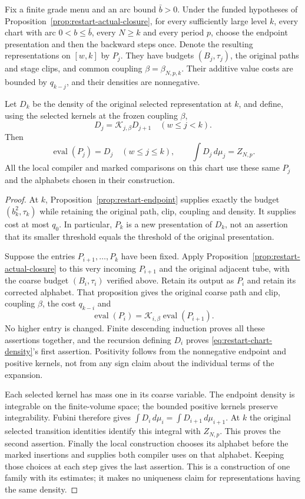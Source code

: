 \begin{proposition}
\label{prop:restart-chart-family}
Fix a finite grade menu and an arc bound $\bar b>0$. Under the funded
hypotheses of Proposition~\ref{prop:restart-actual-closure}, for every
sufficiently large level $k$, every chart with arc $0<b\le\bar b$,
every $N\ge k$ and every
period $p$, choose the endpoint presentation and then the backward
steps once. Denote the resulting representations on $[w,k]$ by $P_j$.
They have budgets $(B_j,\tau_j)$, the original paths and stage clips,
and common coupling $\beta=\beta_{N,p,k}$. Their additive value costs
are bounded by $q_{k-j}$, and their densities are nonnegative.

Let $D_k$ be the density of the original selected representation at $k$,
and define, using the selected kernels at the frozen coupling $\beta$,
\[
 D_j=\mathcal K_{j,\beta}D_{j+1}\quad(w\le j<k).
\]
Then
\begin{equation}\label{eq:restart-chart-density}
 \operatorname{eval}(P_j)=D_j\quad(w\le j\le k),\qquad
 \int D_j\,d\mu_j=Z_{N,p}.
\end{equation}
All the local compiler and marked comparisons on this chart use these
same $P_j$ and the alphabets chosen in their construction.
\end{proposition}
\begin{proof}
At $k$, Proposition~\ref{prop:restart-endpoint} supplies exactly the
budget $(b_k^2,\tau_k)$ while retaining the original path, clip,
coupling and density. It supplies cost at most $q_0$. In particular,
$P_k$ is a new presentation of $D_k$, not an assertion that its smaller
threshold equals the threshold of the original presentation.

Suppose the entries $P_{i+1},\ldots,P_k$ have been fixed. Apply
Proposition~\ref{prop:restart-actual-closure} to this very incoming
$P_{i+1}$ and the original adjacent tube, with the coarse budget
$(B_i,\tau_i)$ verified above. Retain its output as $P_i$ and retain
its corrected alphabet. That proposition gives the original coarse
path and clip, coupling $\beta$, the cost $q_{k-i}$ and
\[
 \operatorname{eval}(P_i)
   =\mathcal K_{i,\beta}\operatorname{eval}(P_{i+1}).
\]
No higher entry is changed. Finite descending induction proves all
these assertions together, and the recursion defining $D_i$ proves
\eqref{eq:restart-chart-density}'s first assertion. Positivity follows
from the nonnegative endpoint and positive kernels, not from any sign
claim about the individual terms of the expansion.

Each selected kernel has mass one in its coarse variable.
The endpoint density is integrable on the finite-volume space; the
bounded positive kernels preserve integrability. Fubini therefore gives
$\int D_i\,d\mu_i=\int D_{i+1}\,d\mu_{i+1}$. At $k$ the original
selected transition identities identify this integral with $Z_{N,p}$.
This proves the second assertion. Finally the local construction chooses
its alphabet before the marked insertions and supplies both compiler
uses on that alphabet. Keeping those choices at each step gives the
last assertion. This is a construction of one family with its estimates;
it makes no uniqueness claim for representations having the same density.
\end{proof}
